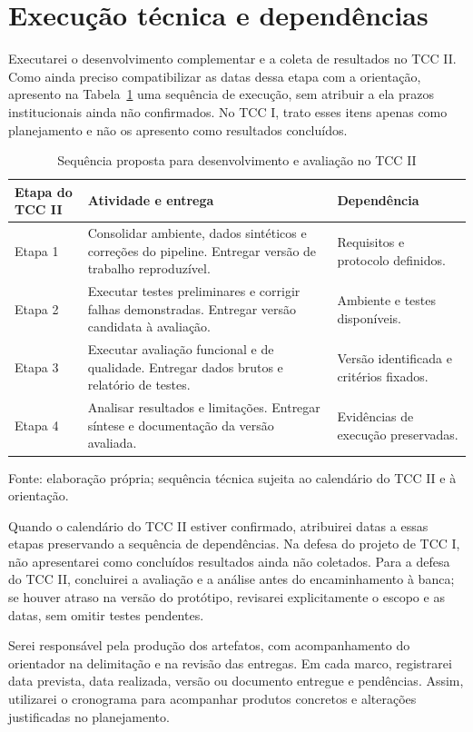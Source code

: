 \section{Execução técnica e dependências}

Executarei o desenvolvimento complementar e a coleta de resultados no TCC II. Como ainda preciso compatibilizar as datas dessa etapa com a orientação, apresento na Tabela~\ref{tab:execucao-tecnica} uma sequência de execução, sem atribuir a ela prazos institucionais ainda não confirmados. No TCC I, trato esses itens apenas como planejamento e não os apresento como resultados concluídos.

\begin{table}[htb]
\centering
\caption{Sequência proposta para desenvolvimento e avaliação no TCC II}
\label{tab:execucao-tecnica}
\small
\begin{tabular}{p{}p{}p{}}
\hline
\textbf{Etapa do TCC II} & \textbf{Atividade e entrega} & \textbf{Dependência} \\ \hline
Etapa 1 & Consolidar ambiente, dados sintéticos e correções do pipeline. Entregar versão de trabalho reproduzível. & Requisitos e protocolo definidos. \\ \hline
Etapa 2 & Executar testes preliminares e corrigir falhas demonstradas. Entregar versão candidata à avaliação. & Ambiente e testes disponíveis. \\ \hline
Etapa 3 & Executar avaliação funcional e de qualidade. Entregar dados brutos e relatório de testes. & Versão identificada e critérios fixados. \\ \hline
Etapa 4 & Analisar resultados e limitações. Entregar síntese e documentação da versão avaliada. & Evidências de execução preservadas. \\ \hline
\end{tabular}
\par\smallskip
{\footnotesize Fonte: elaboração própria; sequência técnica sujeita ao calendário do TCC II e à orientação.}
\end{table}

Quando o calendário do TCC II estiver confirmado, atribuirei datas a essas etapas preservando a sequência de dependências. Na defesa do projeto de TCC I, não apresentarei como concluídos resultados ainda não coletados. Para a defesa do TCC II, concluirei a avaliação e a análise antes do encaminhamento à banca; se houver atraso na versão do protótipo, revisarei explicitamente o escopo e as datas, sem omitir testes pendentes.

Serei responsável pela produção dos artefatos, com acompanhamento do orientador na delimitação e na revisão das entregas. Em cada marco, registrarei data prevista, data realizada, versão ou documento entregue e pendências. Assim, utilizarei o cronograma para acompanhar produtos concretos e alterações justificadas no planejamento.
